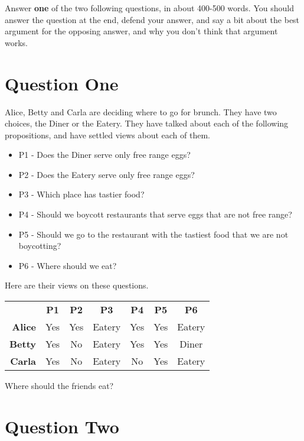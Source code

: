 
\def\mytitle{Aggregation}
\def\myauthor{Assignment 7}
\def\mydate{Due March 23, 5pm}


\noindent Answer \textbf{one} of the two following questions, in about 400-500 words. You should answer the question at the end, defend your answer, and say a bit about the best argument for the opposing answer, and why you don't think that argument works.

\section*{Question One}

Alice, Betty and Carla are deciding where to go for brunch. They have two choices, the Diner or the Eatery. They have talked about each of the following propositions, and have settled views about each of them.

\begin{itemize}
\item P1 - Does the Diner serve only free range eggs?
\item P2 - Does the Eatery serve only free range eggs?
\item P3 - Which place has tastier food?
\item P4 - Should we boycott restaurants that serve eggs that are not free range?
\item P5 - Should we go to the restaurant with the tastiest food that we are not boycotting?
\item P6 - Where should we eat?
\end{itemize}
Here are their views on these questions.

\begin{center}
\begin{tabular}{r c c c c c c}
 & \textbf{P1} & \textbf{P2} & \textbf{P3} & \textbf{P4} & \textbf{P5} & \textbf{P6} \\
\textbf{Alice} & Yes & Yes & Eatery & Yes & Yes & Eatery \\
\textbf{Betty} & Yes & No & Eatery & Yes & Yes & Diner \\
\textbf{Carla} & Yes & No & Eatery & No & Yes & Eatery
\end{tabular}
\end{center}
Where should the friends eat?

\section*{Question Two}

